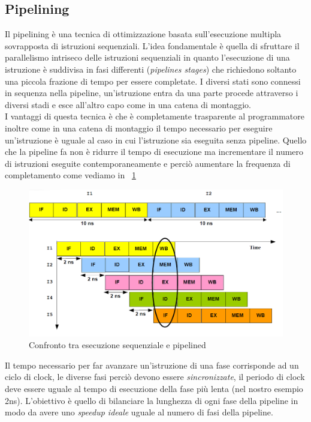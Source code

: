 \subsection{Pipelining}
Il pipelining è una tecnica di ottimizzazione basata sull'esecuzione multipla sovrapposta di istruzioni sequenziali. L'idea fondamentale è quella di sfruttare il parallelismo intriseco delle istruzioni sequenziali in quanto l'esecuzione di una istruzione è suddivisa in fasi differenti (\emph{pipelines stages}) che richiedono soltanto una piccola frazione di tempo per essere completate. I diversi stati sono connessi in sequenza nella pipeline, un'istruzione entra da una parte procede attraverso i diversi stadi e esce all'altro capo come in una catena di montaggio.\\
I vantaggi di questa tecnica è che è completamente trasparente al programmatore  inoltre come in una catena di montaggio il tempo necessario per eseguire un'istruzione è uguale al caso in cui l'istruzione sia eseguita senza pipeline. Quello che la pipeline fa non è ridurre il tempo di esecuzione ma incrementare il numero di istruzioni eseguite contemporaneamente e perciò aumentare la frequenza di completamento come vediamo in \figurename~\ref{fig:seqvspipe}\\
\begin{figure}[tb]
\centering
\includegraphics[scale=0.45]{img/seqvspipe.png}
\caption{Confronto tra esecuzione sequenziale e pipelined}\label{fig:seqvspipe}
\end{figure}
Il tempo necessario per far avanzare un'istruzione di una fase corrisponde ad un ciclo di clock, le diverse fasi perciò devono essere \emph{sincronizzate}, il periodo di clock deve essere uguale al tempo di esecuzione della fase più lenta (nel nostro esempio 2ns). L'obiettivo è quello di bilanciare la lunghezza di ogni fase della pipeline in modo da avere uno \emph{speedup ideale} uguale al numero di fasi della pipeline.\\
